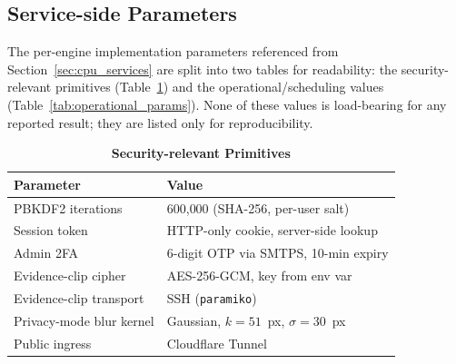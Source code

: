 \documentclass{ieeeaccess}
\begin{document}
\begin{table}[ht!]
\caption{\textbf{Deployed Models and Artefacts (Hailo-8L)}}
\label{tab:model_specs}
\setlength{\tabcolsep}{2pt}
\centering\footnotesize
{}
\end{table}


\subsection{Service-side Parameters}
\label{sec:service_params}
The per-engine implementation parameters referenced from Section~\ref{sec:cpu_services} are split into two tables for readability: the security-relevant primitives (Table~\ref{tab:security_params}) and the operational/scheduling values (Table~\ref{tab:operational_params}). None of these values is load-bearing for any reported result; they are listed only for reproducibility.

\begin{table}[ht!]
\caption{\textbf{Security-relevant Primitives}}
\label{tab:security_params}
\setlength{\tabcolsep}{3pt}
\centering\footnotesize
\begin{tabular}{|l|p{4.0cm}|}
\hline
\textbf{Parameter} & \textbf{Value} \\
\hline
PBKDF2 iterations & 600{,}000 (SHA-256, per-user salt) \\
Session token & HTTP-only cookie, server-side lookup \\
Admin 2FA & 6-digit OTP via SMTPS, 10-min expiry \\
Evidence-clip cipher & AES-256-GCM, key from env var \\
Evidence-clip transport & SSH (\texttt{paramiko}) \\
Privacy-mode blur kernel & Gaussian, $k{=}51$~px, $\sigma{=}30$~px \\
Public ingress & Cloudflare Tunnel \\
\hline
\end{tabular}
\end{table}
\end{document}
